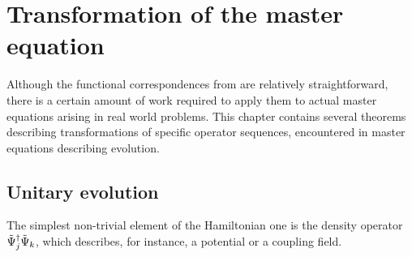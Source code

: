 \chapter{Transformation of the master equation}
\label{cha:wigner-spec}

Although the functional correspondences from  are relatively straightforward, there is a certain amount of work required to apply them to actual master equations arising in real world problems.
This chapter contains several theorems describing transformations of specific operator sequences,
encountered in master equations describing  evolution.


\section{Unitary evolution}

The simplest non-trivial element of the Hamiltonian one is the density operator $\tilde{\Psi}_j^\dagger \tilde{\Psi}_k$, which describes, for instance, a potential or a coupling field.

